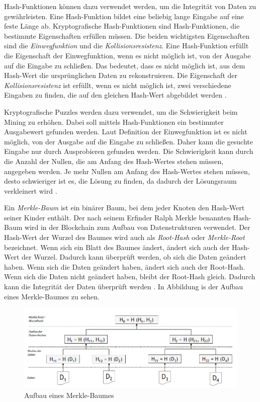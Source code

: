 Hash-Funktionen können dazu verwendet werden, um die Integrität von Daten zu gewährleisten. Eine Hash-Funktion bildet eine beliebig lange Eingabe auf eine feste Länge ab. Kryptografische Hash-Funktionen sind Hash-Funktionen, die bestimmte Eigenschaften erfüllen müssen. Die beiden wichtigsten Eigenschaften sind die \textit{Einwegfunktion} und die \textit{Kollisionsresistenz}. Eine Hash-Funktion erfüllt die Eigenschaft der Einwegfunktion, wenn es nicht möglich ist, von der Ausgabe auf die Eingabe zu schließen. Das bedeutet, dass es nicht möglich ist, aus dem Hash-Wert die ursprünglichen Daten zu rekonstruieren. Die Eigenschaft der \textit{Kollisionsresistenz} ist erfüllt, wenn es nicht möglich ist, zwei verschiedene Eingaben zu finden, die auf den gleichen Hash-Wert abgebildet werden \parencites[S. 12-13]{Brünnler_BlockchainKurzGut}[S. 6]{Fill_BlockchainGrundlagen}.

Kryptografische Puzzles werden dazu verwendet, um die Schwierigkeit beim Mining zu erhöhen. Dabei soll mittels Hash-Funktionen ein bestimmter Ausgabewert gefunden werden. Laut Definition der Einwegfunktion ist es nicht möglich, von der Ausgabe auf die Eingabe zu schließen. Daher kann die gesuchte Eingabe nur durch Ausprobieren gefunden werden. Die Schwierigkeit kann durch die Anzahl der Nullen, die am Anfang des Hash-Wertes stehen müssen, angegeben werden. Je mehr Nullen am Anfang des Hash-Wertes stehen müssen, desto schwieriger ist es, die Lösung zu finden, da dadurch der Lösungsraum verkleinert wird \parencite[S. 6-7]{Fill_BlockchainGrundlagen}.

Ein \textit{Merkle-Baum} ist ein binärer Baum, bei dem jeder Knoten den Hash-Wert seiner Kinder enthält. Der nach seinem Erfinder Ralph Merkle benannten Hash-Baum wird in der Blockchain zum Aufbau von Datenstrukturen verwendet. Der Hash-Wert der Wurzel des Baumes wird auch als \textit{Root-Hash} oder \textit{Merkle-Root} bezeichnet. Wenn sich ein Blatt des Baumes ändert, ändert sich auch der Hash-Wert der Wurzel. Dadurch kann überprüft werden, ob sich die Daten geändert haben. Wenn sich die Daten geändert haben, ändert sich auch der Root-Hash. Wenn sich die Daten nicht geändert haben, bleibt der Root-Hash gleich. Dadurch kann die Integrität der Daten überprüft werden \parencite[S. 7-8]{Fill_BlockchainGrundlagen}. In Abbildung is der Aufbau eines Merkle-Baumes zu sehen.

\begin{figure}[H]
    \centering
    \includegraphics[width=0.9\linewidth]{images/merkle_tree.png}
    \caption{Aufbau eines Merkle-Baumes \parencite[S. 8]{Fill_BlockchainGrundlagen}}
    \label{fig:merkle_tree}
\end{figure}




